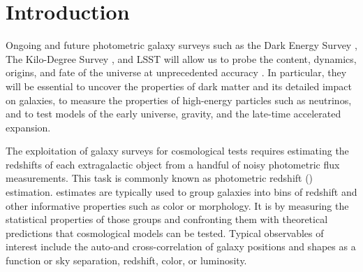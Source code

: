 \documentclass[aps,prd,showpacs,superscriptaddress,groupedaddress]{revtex4}  %
\begin{document}

\maketitle

  
\section{Introduction}

Ongoing and future photometric galaxy surveys such as the Dark Energy Survey \citep[DES,][]{Abbott:2005bi}, The Kilo-Degree Survey \citep[KIDS,][]{deJong:2013}, and LSST \citep{Abell:2009aa} will allow us to probe the content, dynamics, origins, and fate of the universe at unprecedented accuracy \citep[see \eg][]{Peacock:2006kj, Weinberg:2012es}. 
In particular, they will be essential to uncover the properties of dark matter and its detailed impact on galaxies, to measure the properties of high-energy particles such as neutrinos, and to test models of the early universe, gravity, and the late-time accelerated expansion.

The exploitation of galaxy surveys for cosmological tests requires estimating the redshifts of each extragalactic object from a handful of noisy photometric flux measurements.
This task is commonly known as photometric redshift (\photoz) estimation.
\photoz estimates are typically used to group galaxies into bins of redshift and other informative properties such as color or morphology.
It is by measuring the statistical properties of those groups and confronting them with theoretical predictions that cosmological models can be tested.
Typical observables of interest include the auto-and cross-correlation of galaxy positions and shapes as a function or sky separation, redshift, color, or luminosity.
\end{document}
